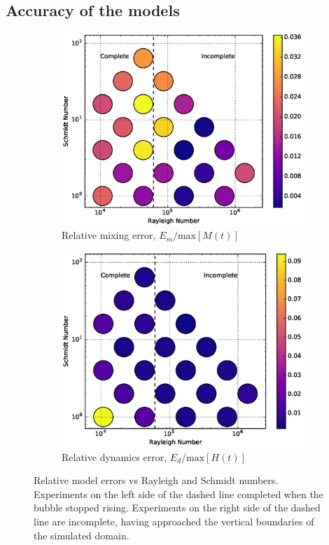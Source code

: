 \subsection{Accuracy of the models}

\begin{figure}
\begin{subfigure}[b]{\columnwidth}
\includegraphics[width=\columnwidth]{figs/MixingError-vs-Rayleigh-Schmidt}
\caption{Relative mixing error, $E_m/\text{max}[M(t)]$}
\end{subfigure}
\begin{subfigure}[b]{\columnwidth}
\includegraphics[width=\columnwidth]{figs/DynamicsError-vs-Rayleigh-Schmidt}
\caption{Relative dynamics error, $E_d/\text{max}[H(t)]$}
\end{subfigure}
\caption{ 
  Relative model errors vs Rayleigh and Schmidt numbers.
  Experiments on the left side of the dashed line completed when the bubble stopped rising.
  Experiments on the right side of the dashed line are incomplete, having approached the vertical boundaries of the simulated domain.
}
\end{figure}

